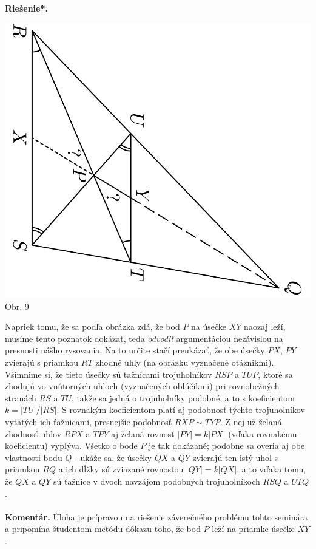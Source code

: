 \documentclass[11pt,a4paper,oneside,final]{book}
\newcommand{\kom}{\textbf{Komentár.} }
\newcommand{\rieh}{\textbf{Riešenie*.} }
\begin{document}
\rieh
\begin{center}
\includegraphics{66D51}\\

Obr. 9
\end{center}
Napriek tomu, že sa podľa obrázka zdá, že bod $P$ na úsečke $XY$ naozaj leží, musíme tento poznatok dokázať, teda \textit{odvodiť} argumentáciou nezávislou na presnosti nášho rysovania. Na to určite stačí preukázať, že obe úsečky $PX$, $PY$ zvierajú s priamkou $RT$ zhodné uhly (na obrázku vyznačené otáznikmi). Všimnime si, že tieto úsečky sú ťažnicami trojuholníkov $RSP$ a $TUP$, ktoré sa zhodujú vo vnútorných uhloch (vyznačených oblúčikmi) pri rovnobežných stranách $RS$ a $TU$, takže sa jedná o trojuholníky podobné, a to s koeficientom $k = |TU|/|RS|$. S rovnakým koeficientom platí aj podobnosť  týchto trojuholníkov vyťatých ich ťažnicami, presnejšie podobnosť $RXP \sim TYP$. Z nej už želaná zhodnosť uhlov $RPX$ a $TPY$ aj želaná rovnosť $|PY | = k|PX|$ (vďaka rovnakému koeficientu) vyplýva. Všetko o bode $P$ je tak dokázané; podobne sa overia aj obe vlastnosti bodu $Q$ - ukáže sa, že úsečky $QX$ a $QY$ zvierajú ten istý uhol s priamkou $RQ$ a ich dĺžky sú zviazané rovnosťou $|QY | = k|QX|$, a to vďaka tomu, že $QX$ a $QY$ sú ťažnice v dvoch navzájom podobných trojuholníkoch $RSQ$ a $UTQ$.\\
\\
\kom Úloha je prípravou na riešenie záverečného problému tohto seminára a pripomína študentom metódu dôkazu toho, že bod $P$ leží na priamke úsečke $XY$.\\
\end{document}
